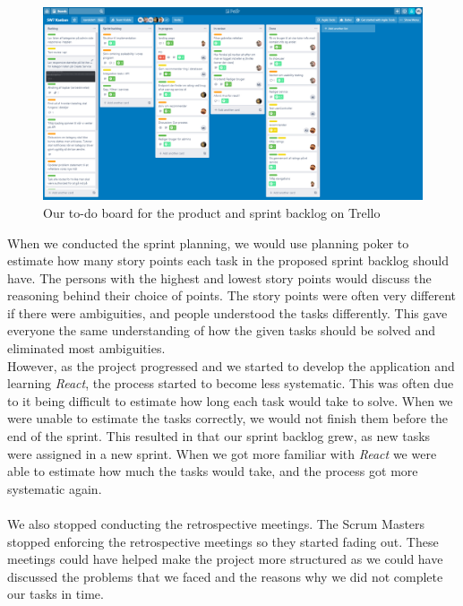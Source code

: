 \begin{figure}[H]
    \centering
    \includegraphics[width=0.8\linewidth]{figures/trellopicture.PNG}
    \caption{Our to-do board for the product and sprint backlog on Trello}
    \label{fig:trello-board}
\end{figure}
\noindent
When we conducted the sprint planning, we would use planning poker to estimate how many story points each task in the proposed sprint backlog should have.
The persons with the highest and lowest story points would discuss the reasoning behind their choice of points.
The story points were often very different if there were ambiguities, and people understood the tasks differently.
This gave everyone the same understanding of how the given tasks should be solved and eliminated most ambiguities. 
\\
However, as the project progressed and we started to develop the application and learning \textit{React}, the process started to become less systematic.
This was often due to it being difficult to estimate how long each task would take to solve.
When we were unable to estimate the tasks correctly, we would not finish them before the end of the sprint. 
This resulted in that our sprint backlog grew, as new tasks were assigned in a new sprint.
When we got more familiar with \textit{React} we were able to estimate how much the tasks would take, and the process got more systematic again.
\\\\
We also stopped conducting the retrospective meetings.
The Scrum Masters stopped enforcing the retrospective meetings so they started fading out.
These meetings could have helped make the project more structured as we could have discussed the problems that we faced and the reasons why we did not complete our tasks in time.

